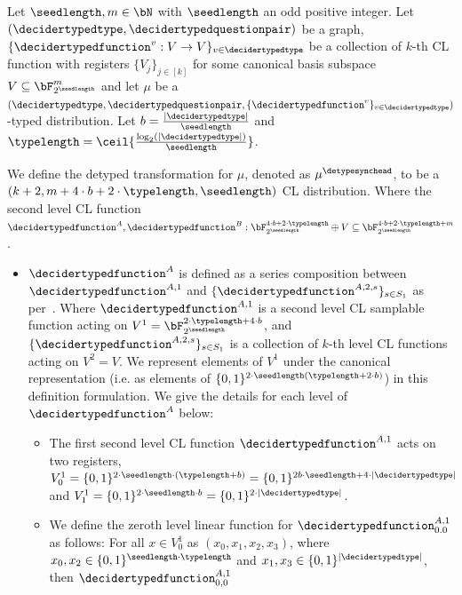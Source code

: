 \begin{definition} \label{def:detypeCLsampler}
	Let $\seedlength, m \in \bN$ with $\seedlength$ an odd positive integer. Let $(\decidertypedtype, \decidertypedquestionpair)$ be a graph, $\{\decidertypedfunction^v: V \rightarrow V\}_{v \in \decidertypedtype}$ be a collection of $k$-th CL function with registers $\{V_j\}_{j \in [k]}$ for some canonical basis subspace $V \subseteq \bF_{2^{\seedlength}}^{m}$ and let $\mu$ be a $(\decidertypedtype, \decidertypedquestionpair, \{\decidertypedfunction^v \}_{v \in \decidertypedtype})$-typed distribution. Let $b  = \frac{|\decidertypedtype|}{\seedlength}$ and $\typelength = \ceil{\frac{\log_2(|\decidertypedtype|)}{\seedlength}}$. 
	
	We define the detyped transformation for $\mu$, denoted as $\mu^{\detypesynchead}$, to be a $(k+2, m+ 4\cdot b + 2\cdot \typelength, \seedlength)$ CL distribution. Where the second level CL function $\decidertypedfunction^A, \decidertypedfunction^B: \bF_{2^\seedlength}^{4\cdot b + 2\cdot \typelength} \oplus V \subseteq \bF_{2^\seedlength}^{ 4\cdot b + 2\cdot \typelength + m}$. 
	\begin{itemize}
		\item $\decidertypedfunction^A$ is defined as a series composition between $\decidertypedfunction^{A,1}$ and $\{\decidertypedfunction^{A,2,s} \}_{s \in S_1}$ as per~. Where $\decidertypedfunction^{A,1}$ is a second level CL samplable function acting on $V^1 = \bF_{2^\seedlength}^{2\cdot \typelength + 4\cdot b}$, and $\{\decidertypedfunction^{A,2,s} \}_{s \in S_1}$ is a collection of $k$-th level CL functions acting on $V^2 = V$. We represent elements of $V^1$ under the canonical representation (i.e. as elements of $\{0,1\}^{2 \cdot \seedlength (\typelength+ 2 \cdot  b)}$) in this definition formulation. We give the details for each level of $\decidertypedfunction^A$ below:
		\begin{itemize}
			\item The first second level CL function $\decidertypedfunction^{A,1}$ acts on two registers, $V^1_0 = \{0,1\}^{ 2 \cdot \seedlength \cdot(\typelength + b)} = \{0,1\}^{2b\cdot \seedlength + 4 \cdot |\decidertypedtype| }$ and $V^1_1 = \{0,1\}^{ 2 \cdot \seedlength \cdot b} = \{0,1\}^{2 \cdot |\decidertypedtype|}$. 
			\item We define the zeroth level linear function for $\decidertypedfunction^{A,1}_{0.0}$ as follows: For all  $x \in V^1_0$ as $(x_0, x_1, x_2,x_3)$, where $x_0, x_2 \in \{0,1\}^{\seedlength \cdot \typelength}$ and $x_1, x_3 \in \{0,1\}^{|\decidertypedtype|}$, then $\decidertypedfunction^{A,1}_{0,0}$

\end{itemize}
\end{itemize}
\end{definition}
